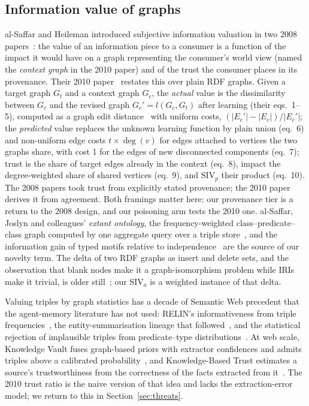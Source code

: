 \documentclass{ceurart}
\newcommand{\Gc}{G_c}
\newcommand{\Gt}{G_t}
\newcommand{\Gcp}{G_c'}
\newcommand{\Ec}{E_c}
\newcommand{\Ecp}{E_c'}
\newcommand{\SIVp}{\mathrm{SIV}_p}
\newcommand{\SIVa}{\mathrm{SIV}_a}
\newcommand{\degv}{\deg}
\begin{document}
\subsection{Information value of graphs}
al-Saffar and Heileman introduced subjective information valuation in two 2008 papers~\cite{alsaffar2008impact,alsaffar2008valuation}: the value of an information piece to a consumer is a function of the impact it would have on a graph representing the consumer's world view (named the \emph{context graph} in the 2010 paper) and of the trust the consumer places in its provenance. Their 2010 paper~\cite{alsaffar2010siv} restates this over plain RDF graphs. Given a target graph $\Gt$ and a context graph $\Gc$, the \emph{actual} value is the dissimilarity between $\Gc$ and the revised graph $\Gcp=l(\Gc,\Gt)$ after learning (their eqs.~1--5), computed as a graph edit distance~\cite{bunke1997ged} with uniform costs, $(|\Ecp|-|\Ec|)/|\Ecp|$; the \emph{predicted} value replaces the unknown learning function by plain union (eq.~6) and non-uniform edge costs $t\times\degv(v)$ for edges attached to vertices the two graphs share, with cost 1 for the edges of new disconnected components (eq.~7); trust is the share of target edges already in the context (eq.~8), impact the degree-weighted share of shared vertices (eq.~9), and $\SIVp$ their product (eq.~10). The 2008 papers took trust from explicitly stated provenance; the 2010 paper derives it from agreement. Both framings matter here: our provenance tier is a return to the 2008 design, and our poisoning arm tests the 2010 one. al-Saffar, Joslyn and colleagues' \emph{extant ontology}, the frequency-weighted class--predicate--class graph computed by one aggregate query over a triple store~\cite{alsaffar2011extant}, and the information gain of typed motifs relative to independence~\cite{joslyn2011motifs} are the source of our novelty term. The delta of two RDF graphs as insert and delete sets, and the observation that blank nodes make it a graph-isomorphism problem while IRIs make it trivial, is older still~\cite{bernerslee2001delta}; our $\SIVa$ is a weighted instance of that delta.

Valuing triples by graph statistics has a decade of Semantic Web precedent that the agent-memory literature has not used: RELIN's informativeness from triple frequencies~\cite{cheng2011relin}, the entity-summarisation lineage that followed~\cite{liu2021entitysumm}, and the statistical rejection of implausible triples from predicate--type distributions~\cite{paulheim2014sdvalidate}. At web scale, Knowledge Vault fuses graph-based priors with extractor confidences and admits triples above a calibrated probability~\cite{dong2014kv}, and Knowledge-Based Trust estimates a source's trustworthiness from the correctness of the facts extracted from it~\cite{dong2015kbt}. The 2010 trust ratio is the naive version of that idea and lacks the extraction-error model; we return to this in Section~\ref{sec:threats}.
\end{document}
